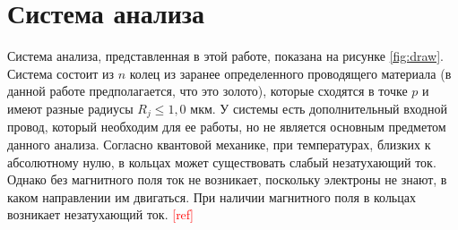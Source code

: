 \documentclass[A4,12pt,oneside]{article}
\renewcommand{\(}{\left(}
\renewcommand{\)}{\right)}
\newcommand{\citeph}{\textcolor{red}{[ref] }}
\begin{document}
\section{Система анализа}

Система анализа, представленная в этой работе, показана на рисунке \ref{fig:draw}. Система состоит из $n$ колец из заранее определенного проводящего материала (в данной работе предполагается, что это золото), которые сходятся в точке $p$ и имеют разные радиусы $R_j \leq 1,0$ мкм. У системы есть дополнительный входной провод, который необходим для ее работы, но не является основным предметом данного анализа. Согласно квантовой механике, при температурах, близких к абсолютному нулю, в кольцах может существовать слабый незатухающий ток. Однако без магнитного поля ток не возникает, поскольку электроны не знают, в каком направлении им двигаться. При наличии магнитного поля в кольцах возникает незатухающий ток. \citeph

\end{document}
